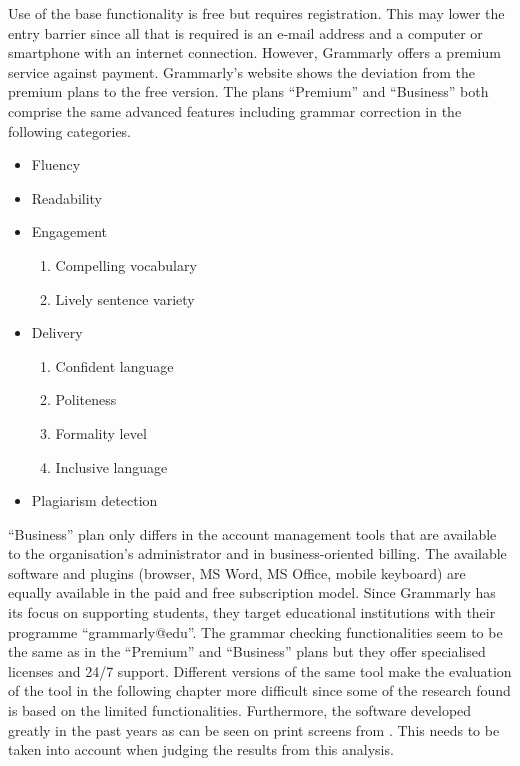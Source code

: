 \documentclass[runningheads]{llncs}
\let\OldTextregistered\textregistered
\renewcommand{\textregistered}{\OldTextregistered\xspace}
\begin{document}
Use of the base functionality is free but requires registration. This may lower the entry barrier since all that is required is an e-mail address and a computer or smartphone with an internet connection. However, Grammarly\textregistered offers a premium service against payment. Grammarly\textregistered's website \citep{noauthor_grammarly_nodate} shows the deviation from the premium plans to the free version. The plans ``Premium'' and ``Business'' both comprise the same advanced features including grammar correction in the following categories.
\begin{itemize}
 \item Fluency
 \item Readability
 \item Engagement
 \begin{enumerate}
  \item Compelling vocabulary
  \item Lively sentence variety
 \end{enumerate}
 \item Delivery
 \begin{enumerate}
  \item Confident language
  \item Politeness
  \item Formality level
  \item Inclusive language
 \end{enumerate}
 \item Plagiarism detection
\end{itemize}
``Business'' plan only differs in the account management tools that are available to the organisation's administrator and in business-oriented billing. The available software and plugins (browser, MS Word, MS Office, mobile keyboard) are equally available in the paid and free subscription model. Since Grammarly\textregistered has its focus on supporting students, they target educational institutions with their programme ``grammarly@edu''. The grammar checking functionalities seem to be the same as in the ``Premium'' and ``Business'' plans but they offer specialised licenses and 24/7 support. Different versions of the same tool make the evaluation of the tool in the following chapter more difficult since some of the research found is based on the limited functionalities. Furthermore, the software developed greatly in the past years as can be seen on print screens from \textcite{dembsey_closing_2017}. This needs to be taken into account when judging the results from this analysis.
\end{document}
